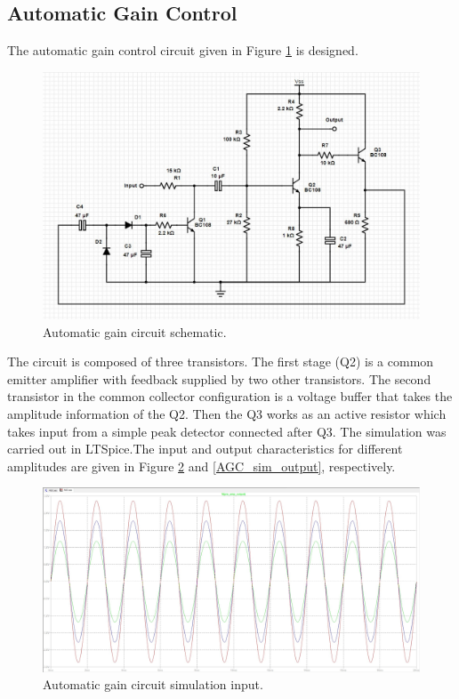 \documentclass[a4paper,10pt]{IEEEtran}
\begin{document}
\subsection{Automatic Gain Control}
The automatic gain control circuit given in Figure \ref{AGC} is designed.

\begin{figure}[htbp!]
    \centering
    \includegraphics[width = 1\linewidth]{AGC Circuit.jpg}
    \caption{Automatic gain circuit schematic.}
    \label{AGC}
\end{figure} 
 The circuit is composed of three transistors. The first stage (Q2) is a common emitter amplifier with feedback supplied by two other transistors. The second transistor in the common collector configuration is a voltage buffer that takes the amplitude information of the Q2. Then the Q3 works as an active resistor which takes input from a simple peak detector connected after Q3. 
 The simulation was carried out in LTSpice.The input and output characteristics for different amplitudes are given in Figure \ref{AGC_sim_input} and \ref{AGC_sim_output}, respectively.
 \begin{figure}[htbp!]
    \centering
    \includegraphics[width = 1\linewidth]{AGC Simulation Input.jpg}
    \caption{Automatic gain circuit simulation input.}
    \label{AGC_sim_input}
\end{figure} 
\end{document}
